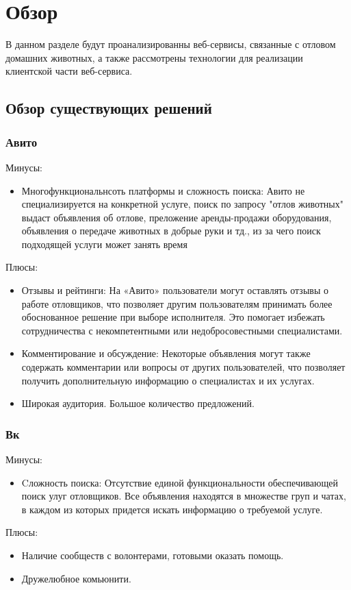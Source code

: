 
\section{Обзор}
\label{sec:relatedworks}
В данном разделе будут проанализированны веб-сервисы, связанные с отловом домашних животных,
а также рассмотрены технологии для реализации клиентской части веб-сервиса.


\subsection{Обзор существующих решений}
\subsubsection{Авито}
Минусы:
  \begin{itemize}
      \item Многофункциональнсоть платформы и сложность поиска: Авито не специализируется на конкретной услуге,
      поиск по запросу "отлов животных" выдаст объявления об отлове, преложение аренды-продажи оборудования,
      объявления о передаче животных в добрые руки и тд., из за чего поиск подходящей услуги может занять время
  \end{itemize}
\quad Плюсы:
  \begin{itemize}
      \item Отзывы и рейтинги: На «Авито» пользователи могут оставлять отзывы о работе отловщиков, что
      позволяет другим пользователям принимать более обоснованное решение при выборе исполнителя. Это
        помогает избежать сотрудничества с некомпетентными или недобросовестными специалистами.
      \item Комментирование и обсуждение: Некоторые объявления могут также содержать комментарии или вопросы
      от других пользователей, что позволяет получить дополнительную информацию о специалистах и их услугах.
      \item Широкая аудитория. Большое количество предложений.
  \end{itemize}
\subsubsection{Вк}
  Минусы:
  \begin{itemize}
      \item Cложность поиска: Отсутствие единой функциональности обеспечивающей поиск улуг отловщиков. Все объявления
      находятся в множестве груп и чатах, в каждом из которых придется искать информацию о требуемой услуге.
  \end{itemize}
\quad Плюсы:
  \begin{itemize}
      \item Наличие сообществ с волонтерами, готовыми оказать помощь.
      \item Дружелюбное комьюнити.
  \end{itemize}
